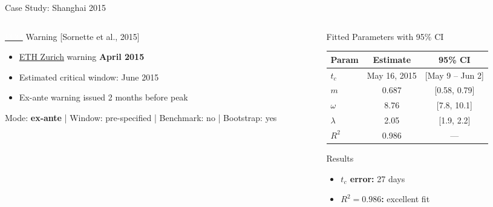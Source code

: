 \documentclass[9pt, aspectratio=169, t]{beamer}
\begin{document}
\begin{frame}{Case Study: Shanghai 2015}
\begin{cminipage}{0.95\textwidth}
{\begin{columns}[T]
\begin{column}{0.47\textwidth}
            \begin{exampleblock}{\href{https://www.er.ethz.ch/financial-crisis-observatory.html}{\textcolor{white}{FCO}} Warning {\scriptsize[Sornette et al., 2015]}}
                \begin{itemize}\setlength{\itemsep}{0pt}
                    \item \href{https://www.er.ethz.ch/financial-crisis-observatory.html}{ETH Zurich} warning \textbf{April 2015}
                    \item Estimated critical window: June 2015
                    \item Ex-ante warning issued 2 months before peak
                \end{itemize}
            \end{exampleblock}
            \vspace{-2mm}
            {\scriptsize\textcolor{MediumGray}{Mode: \textbf{ex-ante} | Window: pre-specified | Benchmark: no | Bootstrap: yes}}
        \end{column}
        \begin{column}{0.47\textwidth}
            \begin{alertblock}{Fitted Parameters with 95\% CI}
                \begin{center}
                    \begin{tabular}{lcc}
                        \toprule
                        \textbf{Param} & \textbf{Estimate} & \textbf{95\% CI} \\
                        \midrule
                        $t_c$ & May 16, 2015 & [May 9 -- Jun 2] \\
                        $m$ & 0.687 & [0.58, 0.79] \\
                        $\omega$ & 8.76 & [7.8, 10.1] \\
                        $\lambda$ & 2.05 & [1.9, 2.2] \\
                        $R^2$ & 0.986 & --- \\
                        \bottomrule
                    \end{tabular}
                \end{center}
            \end{alertblock}

            \begin{exampleblock}{Results}
                \begin{itemize}\setlength{\itemsep}{0pt}
                    \item \textbf{$t_c$ error:} 27 days
                    \item \textbf{$R^2 = 0.986$:} excellent fit
                \end{itemize}
            \end{exampleblock}
        \end{column}
    \end{columns}
    }
    \end{cminipage}
\end{frame}
\end{document}
